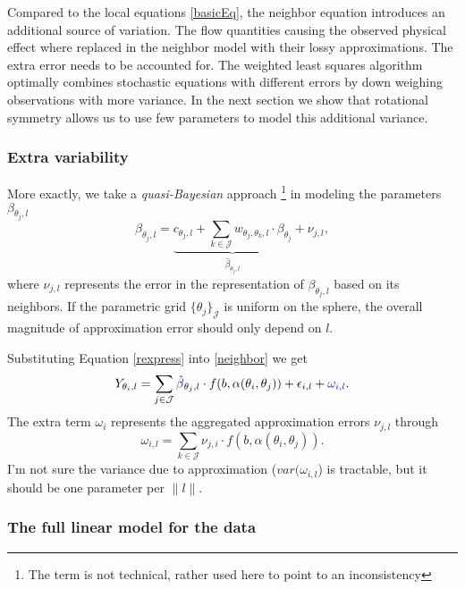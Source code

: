 \documentclass[11pt]{amsart}
\newcommand{\tj}{\theta_j}
\newcommand{\ti}{\theta_i}
\newcommand{\ytil}{Y_{\theta_i,l}}
\begin{document}
Compared to the local equations \eqref{basicEq}, the neighbor equation introduces an additional source of variation. 
The flow quantities causing the observed physical effect where replaced in the neighbor model with their lossy approximations.
The extra error needs to be accounted for. 
The weighted least squares algorithm optimally combines stochastic equations with different errors by
down weighing observations with more variance. In the next section we show that rotational symmetry 
allows us to use few parameters to model this additional variance. 

\subsubsection{Extra variability}
More exactly, we take a \emph{quasi-Bayesian} approach \footnote{The term is not technical, rather used here to point to an inconsistency}
in modeling the parameters $\beta_{\tj,l}$
\begin{equation}
\beta_{\tj,l} = \underbrace{c_{\tj,l} + \sum_{k\in\mathcal{J}} w_{\theta_j,\theta_k, l} \cdot \beta_{\tj}}_{\hat{\beta}_{\tj,l}} + \nu_{j,l}, 
\label{rexpress}
\end{equation}
where $\nu_{j,l}$ represents the error in the representation of $\beta_{\tj,l}$ based on its neighbors. 
If the parametric grid $\{\tj\}_\mathcal{J}$ is uniform on the sphere, the overall magnitude of approximation error 
should only depend on $l$. 

Substituting Equation \eqref{rexpress} into \eqref{neighbor} we get
\begin{equation}
\ytil = \sum_{j \in \mathcal{J}} \textcolor{blue}{\hat{\beta}}_{\tj,l} \cdot f(b, \alpha(\ti, \tj)) + \epsilon_{i,l} +  \textcolor{blue}{\omega_{i,l}}.
\end{equation}
The extra term $\omega_i$ represents the aggregated approximation errors $\nu_{j,l}$ through
\[ \omega_{i,l} = \sum_{k\in\mathcal{J}} \nu_{j,i} \cdot f(b, \alpha(\ti, \tj)).\]
I'm not sure the variance due to approximation ($var(\omega_{i,l}$) is tractable, but it should be one parameter per $\|l\|$. 

\subsubsection{The full linear model for the data}




%
\end{document}
